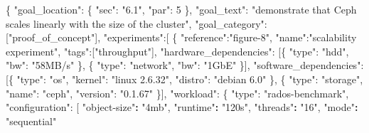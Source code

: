 \documentclass[10pt,reprint]{sigplanconf}
\newenvironment{Shaded}{\begin{snugshade}}{\end{snugshade}}
\newcommand{\DataTypeTok}[1]{\textcolor[rgb]{0.13,0.29,0.53}{{#1}}}
\newcommand{\DecValTok}[1]{\textcolor[rgb]{0.00,0.00,0.81}{{#1}}}
\newcommand{\StringTok}[1]{\textcolor[rgb]{0.31,0.60,0.02}{{#1}}}
\newcommand{\OtherTok}[1]{\textcolor[rgb]{0.56,0.35,0.01}{{#1}}}
\newcommand{\FunctionTok}[1]{\textcolor[rgb]{0.00,0.00,0.00}{{#1}}}
\newcommand{\ErrorTok}[1]{\textbf{{#1}}}
\begin{document}
\begin{Shaded}
\begin{Highlighting}[numbers=left,,]
\FunctionTok{\{}
  \DataTypeTok{"goal_location"}\FunctionTok{:} \FunctionTok{\{}
     \DataTypeTok{"sec"}\FunctionTok{:} \StringTok{"6.1"}\FunctionTok{,}
     \DataTypeTok{"par"}\FunctionTok{:} \DecValTok{5}
  \FunctionTok{\},}
  \DataTypeTok{"goal_text"}\FunctionTok{:} \StringTok{"demonstrate that Ceph scales linearly}
\StringTok{     with the size of the cluster"}\FunctionTok{,}
  \DataTypeTok{"goal_category"}\FunctionTok{:} \OtherTok{[}\StringTok{"proof_of_concept"}\OtherTok{]}\FunctionTok{,}
  \DataTypeTok{"experiments"}\FunctionTok{:}\OtherTok{[} \FunctionTok{\{}
     \DataTypeTok{"reference"}\FunctionTok{:}\StringTok{"figure-8"}\FunctionTok{,}
     \DataTypeTok{"name"}\FunctionTok{:}\StringTok{"scalability experiment"}\FunctionTok{,}
     \DataTypeTok{"tags"}\FunctionTok{:}\OtherTok{[}\StringTok{"throughput"}\OtherTok{]}\FunctionTok{,}
     \DataTypeTok{"hardware_dependencies"}\FunctionTok{:} \OtherTok{[}\FunctionTok{\{}
        \DataTypeTok{"type"}\FunctionTok{:} \StringTok{"hdd"}\FunctionTok{,}
        \DataTypeTok{"bw"}\FunctionTok{:} \StringTok{"58MB/s"}
     \FunctionTok{\}}\OtherTok{,} \FunctionTok{\{}
        \DataTypeTok{"type"}\FunctionTok{:} \StringTok{"network"}\FunctionTok{,}
        \DataTypeTok{"bw"}\FunctionTok{:} \StringTok{"1GbE"}
     \FunctionTok{\}}\OtherTok{]}\FunctionTok{,}
     \DataTypeTok{"software_dependencies"}\FunctionTok{:} \OtherTok{[}\FunctionTok{\{}
       \DataTypeTok{"type"}\FunctionTok{:} \StringTok{"os"}\FunctionTok{,}
       \DataTypeTok{"kernel"}\FunctionTok{:} \StringTok{"linux 2.6.32"}\FunctionTok{,}
       \DataTypeTok{"distro"}\FunctionTok{:} \StringTok{"debian 6.0"}
     \FunctionTok{\}}\OtherTok{,} \FunctionTok{\{}
       \DataTypeTok{"type"}\FunctionTok{:} \StringTok{"storage"}\FunctionTok{,}
       \DataTypeTok{"name"}\FunctionTok{:} \StringTok{"ceph"}\FunctionTok{,}
       \DataTypeTok{"version"}\FunctionTok{:} \StringTok{"0.1.67"}
     \FunctionTok{\}}\OtherTok{]}\FunctionTok{,}
     \DataTypeTok{"workload"}\FunctionTok{:} \FunctionTok{\{}
       \DataTypeTok{"type"}\FunctionTok{:} \StringTok{"rados-benchmark"}\FunctionTok{,}
       \DataTypeTok{"configuration"}\FunctionTok{:} \OtherTok{[}
         \StringTok{"object-size"}\ErrorTok{:} \StringTok{"4mb"}\OtherTok{,}
         \StringTok{"runtime"}\ErrorTok{:} \StringTok{"120s"}\OtherTok{,}
         \StringTok{"threads"}\ErrorTok{:} \StringTok{"16"}\OtherTok{,}
         \StringTok{"mode"}\ErrorTok{:} \StringTok{"sequential"}

\end{Highlighting}
\end{Shaded}
\end{document}
